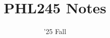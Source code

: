 \documentclass[11pt]{scrartcl}
\begin{document}
\title{PHL245 Notes}
\date{'25 Fall} %
\maketitle

\setcounter{tocdepth}{1}
\tableofcontents
\newpage

 \newpage
 \newpage

\end{document}
